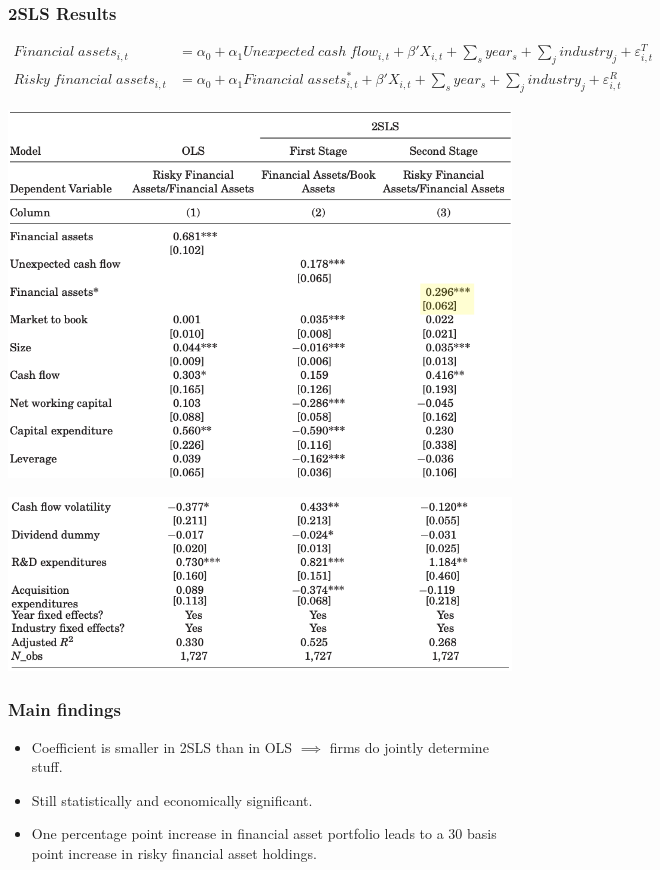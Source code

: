 \documentclass[handout]{beamer}
\begin{document}
\begin{frame}
\frametitle{2SLS Results}

\tiny

\begin{align*}
Financial \; assets_{i,t} &= \alpha_0 + \alpha_1 Unexpected \; cash \; flow_{i,t} + \beta' X_{i,t} + \sum_s year_s + \sum_j industry_j + \varepsilon_{i,t}^T\\
Risky \; financial \; assets_{i,t} &= \alpha_0 + \alpha_1 Financial \; assets_{i,t}^* + \beta' X_{i,t} + \sum_s year_s + \sum_j industry_j + \varepsilon_{i,t}^R
\end{align*}

\centering
\includegraphics[scale=0.20]{regression_1_2sls}

\includegraphics[scale=0.20]{regression_2_2sls}

\end{frame}


\begin{frame}
\frametitle{Main findings}
\begin{itemize}[<+->]
\item Coefficient is smaller in 2SLS than in OLS $\implies$ firms do jointly determine stuff.
\item Still statistically and economically significant.

\item One percentage point increase in financial asset portfolio leads to a 30 basis point increase in risky financial asset holdings.
\end{itemize}
\end{frame}
\end{document}
